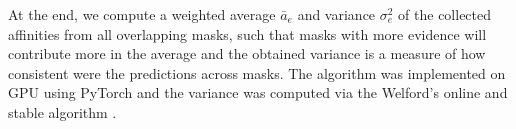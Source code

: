 At the end, we compute a weighted average $\bar{a}_e$ and variance $\sigma^2_e$ of the collected affinities from all overlapping masks, such that masks with more evidence will contribute more in the average and the obtained variance is a measure of how consistent were the predictions across masks. 
The algorithm was implemented on GPU using PyTorch \cite{NEURIPS2019_9015} and the variance was computed via the Welford's online and stable algorithm \cite{welford1962note}.




